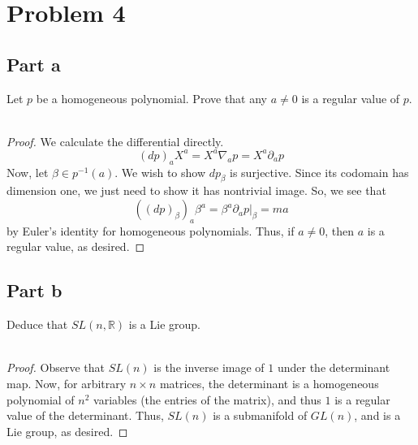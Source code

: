 \documentclass[fontsize=11pt]{scrartcl} %
\numberwithin{equation}{section} %
\numberwithin{figure}{section} %
\numberwithin{table}{section} %
\newcommand{\R}{\mathbb{R}}
\begin{document}
\newpage

\section*{Problem 4}
\subsection*{Part a}
Let $p$ be a homogeneous polynomial. Prove that any $a\neq 0$ is a regular value
of $p$.
\\
\\
\begin{proof}
    We calculate the differential directly.
    \[
        (dp)_aX^a = X^a\nabla_ap = X^a\partial_ap
    \]
    Now, let $\beta\in p^{-1}(a)$. We wish to show $dp_{\beta}$ is surjective.
    Since its codomain has dimension one, we just need to show it has nontrivial
    image. So, we see that
    \[
        ((dp)_{\beta})_a\beta^a = \beta^a\partial_ap|_{\beta} = ma
    \]
    by Euler's identity for homogeneous polynomials. Thus, if $a\neq 0$, then
    $a$ is a regular value, as desired.
\end{proof}

\subsection*{Part b}
Deduce that $SL(n,\R)$ is a Lie group.
\\
\\
\begin{proof}
    Observe that $SL(n)$ is the inverse image of $1$ under the determinant map.
    Now, for arbitrary $n\times n$ matrices, the determinant is a homogeneous
    polynomial of $n^2$ variables (the entries of the matrix), and thus $1$ is a
    regular value of the determinant. Thus, $SL(n)$ is a submanifold of $GL(n)$,
    and is a Lie group, as desired.
\end{proof}


\newpage
\end{document}
